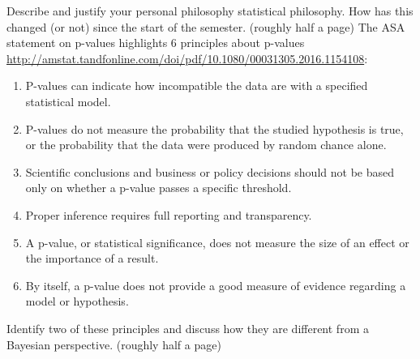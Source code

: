 \documentclass[11pt]{exam}
\begin{document}
\begin{questions}
\question[6] Describe and justify your personal philosophy statistical philosophy. How has this changed (or not) since the start of the semester. (roughly half a page)
\vfill
\question[6] The ASA statement on p-values  highlights 6 principles about p-values\\
\url{http://amstat.tandfonline.com/doi/pdf/10.1080/00031305.2016.1154108}:
\begin{enumerate}
	\item P-values can indicate how incompatible the data are with a specified statistical model.
	\item P-values do not measure the probability that the studied hypothesis is true, or the probability that the data were produced by random chance alone.
	\item Scientific conclusions and business or policy decisions should not be based only on whether a p-value passes a specific threshold.
	\item Proper inference requires full reporting and transparency.
	\item A p-value, or statistical significance, does not measure the size of an effect or the importance of a result.
	\item By itself, a p-value does not provide a good measure of evidence regarding a model or hypothesis.
\end{enumerate}
Identify two of these principles and discuss how they are different from a Bayesian perspective. (roughly half a page)
\vfill
\vfill

\end{questions}
\end{document}
